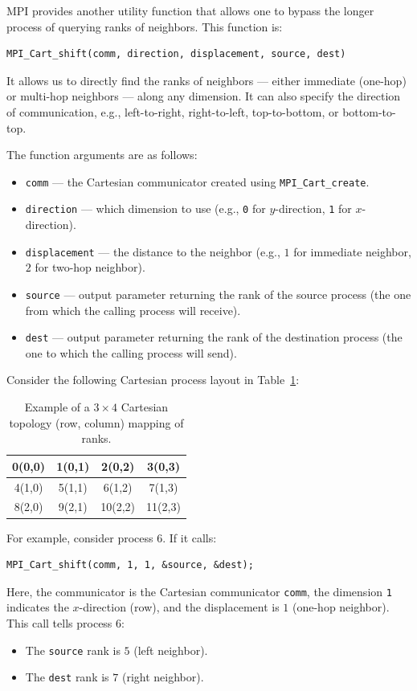 \documentclass[12pt]{book}
\begin{document}
MPI provides another utility function that allows one to bypass the longer process of querying ranks of neighbors. This function is:

\begin{lstlisting}[style=cppstyle]
MPI_Cart_shift(comm, direction, displacement, source, dest)
\end{lstlisting}

It allows us to directly find the ranks of neighbors --- either immediate (one-hop) or multi-hop neighbors --- along any dimension. It can also specify the direction of communication, e.g., left-to-right, right-to-left, top-to-bottom, or bottom-to-top.

The function arguments are as follows:
\begin{itemize}
    \item \texttt{comm} --- the Cartesian communicator created using \texttt{MPI\_Cart\_create}.
    \item \texttt{direction} --- which dimension to use (e.g., \texttt{0} for $y$-direction, \texttt{1} for $x$-direction).
    \item \texttt{displacement} --- the distance to the neighbor (e.g., $1$ for immediate neighbor, $2$ for two-hop neighbor).
    \item \texttt{source} --- output parameter returning the rank of the source process (the one from which the calling process will receive).
    \item \texttt{dest} --- output parameter returning the rank of the destination process (the one to which the calling process will send).
\end{itemize}

Consider the following Cartesian process layout in Table~\ref{tab:mpicartshift}:

\begin{table}[H]
    \centering
    \begin{tabular}{|c|c|c|c|}
    \hline
        0(0,0) & 1(0,1) & 2(0,2) & 3(0,3) \\
    \hline
        4(1,0) & 5(1,1) & 6(1,2) & 7(1,3) \\
    \hline
        8(2,0) & 9(2,1) & 10(2,2) & 11(2,3) \\
    \hline
    \end{tabular}
    \caption{Example of a $3 \times 4$ Cartesian topology (row, column) mapping of ranks.}
    \label{tab:mpicartshift}
\end{table}

For example, consider process $6$. If it calls:
\begin{lstlisting}[style=cppstyle]
MPI_Cart_shift(comm, 1, 1, &source, &dest);
\end{lstlisting}
Here, the communicator is the Cartesian communicator \texttt{comm}, the dimension \texttt{1} indicates the $x$-direction (row), and the displacement is $1$ (one-hop neighbor). This call tells process $6$:
\begin{itemize}
    \item The \texttt{source} rank is $5$ (left neighbor).
    \item The \texttt{dest} rank is $7$ (right neighbor).
\end{itemize}
\end{document}
